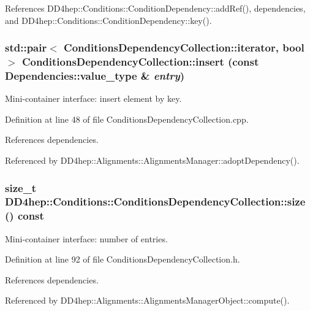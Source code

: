 References DD4hep::Conditions::ConditionDependency::addRef(), dependencies, and DD4hep::Conditions::ConditionDependency::key().\hypertarget{class_d_d4hep_1_1_conditions_1_1_conditions_dependency_collection_a2135e9b1eb88d36301f88d9ef33a11a8}{
\subsubsection[{insert}]{\setlength{\rightskip}{0pt plus 5cm}std::pair$<$ {\bf ConditionsDependencyCollection::iterator}, bool $>$ ConditionsDependencyCollection::insert (const Dependencies::value\_\-type \& {\em entry})}}
\label{class_d_d4hep_1_1_conditions_1_1_conditions_dependency_collection_a2135e9b1eb88d36301f88d9ef33a11a8}


Mini-\/container interface: insert element by key. 

Definition at line 48 of file ConditionsDependencyCollection.cpp.

References dependencies.

Referenced by DD4hep::Alignments::AlignmentsManager::adoptDependency().\hypertarget{class_d_d4hep_1_1_conditions_1_1_conditions_dependency_collection_a49356f3bb237a65906d882d34b9ce295}{
\subsubsection[{size}]{\setlength{\rightskip}{0pt plus 5cm}size\_\-t DD4hep::Conditions::ConditionsDependencyCollection::size () const}}
\label{class_d_d4hep_1_1_conditions_1_1_conditions_dependency_collection_a49356f3bb237a65906d882d34b9ce295}


Mini-\/container interface: number of entries. 

Definition at line 92 of file ConditionsDependencyCollection.h.

References dependencies.

Referenced by DD4hep::Alignments::AlignmentsManagerObject::compute().

